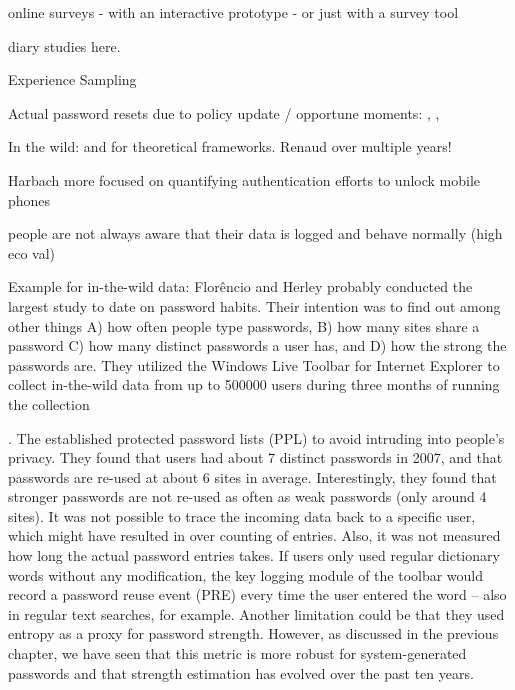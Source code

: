 online surveys 
- with an interactive prototype 
- or just with a survey tool




diary studies here.  \cite{Hayashi2011DiaryStudyPWs}

Experience Sampling \cite{Consolvo2003ESM} 

Actual password resets due to policy update / opportune moments: \cite{Fahl2013EcologicalValidityPasswordStudy}, \cite{Mazurek2013Measuring}, \cite{Renaud2017LessonsLearnedNudges}

In the wild: \cite{Chamberlain2012ResearchInTheWild} and \cite{Henze2013EmpiricalResearchUbiquitous} for theoretical frameworks.
Renaud \cite{Renaud2017LessonsLearnedNudges} over multiple years!

Harbach more focused on quantifying authentication efforts to unlock mobile phones \cite{Harbach2016HardLockLife} 

people are not always aware that their data is logged and behave normally (high eco val)

Example for in-the-wild data: 
Flor\^{e}ncio and Herley probably conducted the largest study to date on password habits. Their intention was to find out among other things A) how often people type passwords, B) how many sites share a password C) how many distinct passwords a user has, and D) how the strong the passwords are. They utilized the Windows Live Toolbar for Internet Explorer to collect in-the-wild data from up to 500000 users during three months of running the collection

\cite{Florencio2007LargeScaleStudyPasswordHabits}. The established protected password lists (PPL) to avoid intruding into people's privacy. They found that users had about 7 distinct passwords in 2007, and that passwords are re-used at about 6 sites in average. Interestingly, they found that stronger passwords are not re-used as often as weak passwords (only around 4 sites). It was not possible to trace the incoming data back to a specific user, which might have resulted in over counting of entries. Also, it was not measured how long the actual password entries takes. If users only used regular dictionary words without any modification, the key logging module of the toolbar would record a password reuse event (PRE) every time the user entered the word -- also in regular text searches, for example. Another limitation could be that they used entropy as a proxy for password strength. However, as discussed in the previous chapter, we have seen that this metric is more robust for system-generated passwords and that strength estimation has evolved over the past ten years. 

